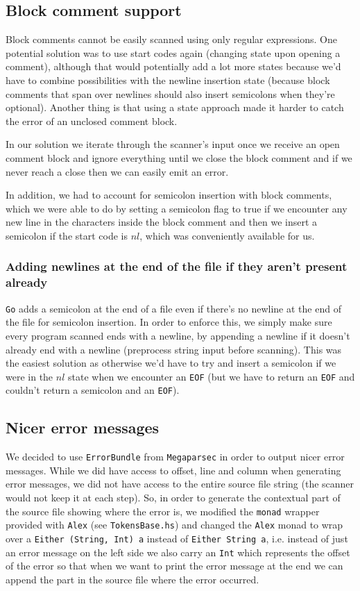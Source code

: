 \documentclass[11pt]{article}
\begin{document}
\subsection{Block comment support}
\label{sec:org5c6273f}
Block comments cannot be easily scanned using only regular
expressions. One potential solution was to use start codes again
(changing state upon opening a comment), although that would
potentially add a lot more states because we'd have to combine
possibilities with the newline insertion state (because block
comments that span over newlines should also insert semicolons when
they're optional). Another thing is that using a state approach
made it harder to catch the error of an unclosed comment block.

In our solution we iterate through the scanner's input once we
receive an open comment block and ignore everything until we close
the block comment and if we never reach a close then we can easily
emit an error.

In addition, we had to account for semicolon insertion with block
comments, which we were able to do by setting a semicolon flag to
true if we encounter any new line in the characters inside the
block comment and then we insert a semicolon if the start code is
\(nl\), which was conveniently available for us.
\subsubsection{Adding newlines at the end of the file if they aren't present already}
\label{sec:org5026cd4}
\texttt{Go} adds a semicolon at the end of a file even if there's no
newline at the end of the file for semicolon insertion. In order
to enforce this, we simply make sure every program scanned ends
with a newline, by appending a newline if it doesn't already end
with a newline (preprocess string input before scanning). This was
the easiest solution as otherwise we'd have to try and insert a
semicolon if we were in the \(nl\) state when we encounter an \texttt{EOF}
(but we have to return an \texttt{EOF} and couldn't return a semicolon
and an \texttt{EOF}).
\subsection{Nicer error messages}
\label{sec:orgf9ef75c}
We decided to use \texttt{ErrorBundle} from \texttt{Megaparsec} in order to
output nicer error messages. While we did have access to offset,
line and column when generating error messages, we did not have
access to the entire source file string (the scanner would not keep
it at each step). So, in order to generate the contextual part of
the source file showing where the error is, we modified the \texttt{monad}
wrapper provided with \texttt{Alex} (see \texttt{TokensBase.hs}) and changed the
\texttt{Alex} monad to wrap over a \texttt{Either (String, Int) a} instead of
\texttt{Either String a}, i.e. instead of just an error message on the
left side we also carry an \texttt{Int} which represents the offset of the
error so that when we want to print the error message at the end we
can append the part in the source file where the error occurred.
\end{document}
